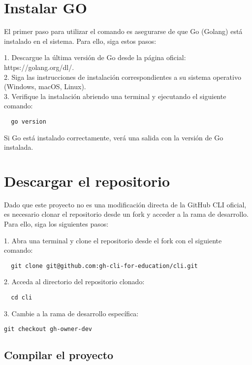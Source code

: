 
\section{Instalar GO}
El primer paso para utilizar el comando es asegurarse de que Go (Golang) está instalado en el sistema. Para ello, siga estos pasos:

1. Descargue la última versión de Go desde la página oficial: https://golang.org/dl/. \\
2. Siga las instrucciones de instalación correspondientes a su sistema operativo (Windows, macOS, Linux). \\
3. Verifique la instalación abriendo una terminal y ejecutando el siguiente comando:

\begin{verbatim}
  go version
\end{verbatim}

Si Go está instalado correctamente, verá una salida con la versión de Go instalada.

\section{Descargar el repositorio}

Dado que este proyecto no es una modificación directa de la GitHub CLI oficial, es necesario clonar el repositorio desde un fork y acceder a la rama de desarrollo. Para ello, siga los siguientes pasos:

1. Abra una terminal y clone el repositorio desde el fork con el siguiente comando:

\begin{verbatim}
  git clone git@github.com:gh-cli-for-education/cli.git
\end{verbatim}

2. Acceda al directorio del repositorio clonado:

\begin{verbatim}
  cd cli
\end{verbatim}

3. Cambie a la rama de desarrollo específica:

\begin{verbatim}
git checkout gh-owner-dev
\end{verbatim}

\subsection{Compilar el proyecto}

